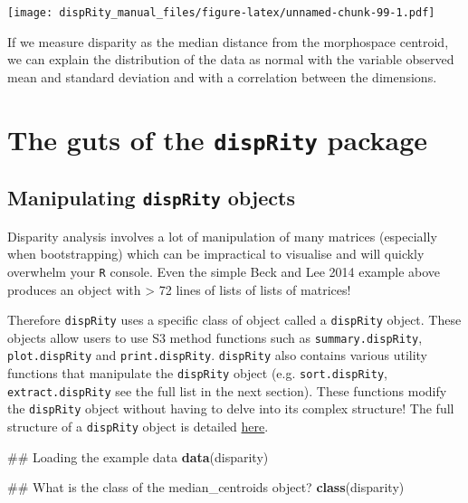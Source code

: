 \documentclass[]{book}
\newenvironment{Shaded}{\begin{snugshade}}{\end{snugshade}}
\newcommand{\KeywordTok}[1]{\textcolor[rgb]{0.13,0.29,0.53}{\textbf{#1}}}
\newcommand{\NormalTok}[1]{#1}
\theoremstyle{definition}
\theoremstyle{definition}
\theoremstyle{definition}
\theoremstyle{remark}
\begin{document}
\texttt{[image: dispRity\_manual\_files/figure-latex/unnamed-chunk-99-1.pdf]}

If we measure disparity as the median distance from the morphospace
centroid, we can explain the distribution of the data as normal with the
variable observed mean and standard deviation and with a correlation
between the dimensions.

\chapter{\texorpdfstring{The guts of the \texttt{dispRity}
package}{The guts of the dispRity package}}\label{the-guts-of-the-disprity-package}

\section{\texorpdfstring{Manipulating \texttt{dispRity}
objects}{Manipulating dispRity objects}}\label{manipulating-disprity-objects}

Disparity analysis involves a lot of manipulation of many matrices
(especially when bootstrapping) which can be impractical to visualise
and will quickly overwhelm your \texttt{R} console. Even the simple Beck
and Lee 2014 example above produces an object with \textgreater{} 72
lines of lists of lists of matrices!

Therefore \texttt{dispRity} uses a specific class of object called a
\texttt{dispRity} object. These objects allow users to use S3 method
functions such as \texttt{summary.dispRity}, \texttt{plot.dispRity} and
\texttt{print.dispRity}. \texttt{dispRity} also contains various utility
functions that manipulate the \texttt{dispRity} object (e.g.
\texttt{sort.dispRity}, \texttt{extract.dispRity} see the full list in
the next section). These functions modify the \texttt{dispRity} object
without having to delve into its complex structure! The full structure
of a \texttt{dispRity} object is detailed
\href{https://github.com/TGuillerme/dispRity/blob/master/disparity_object.md}{here}.

\begin{Shaded}
\begin{Highlighting}[]
\NormalTok{## Loading the example data}
\KeywordTok{data}\NormalTok{(disparity)}

\NormalTok{## What is the class of the median_centroids object?}
\KeywordTok{class}\NormalTok{(disparity)}
\end{Highlighting}
\end{Shaded}
\end{document}
